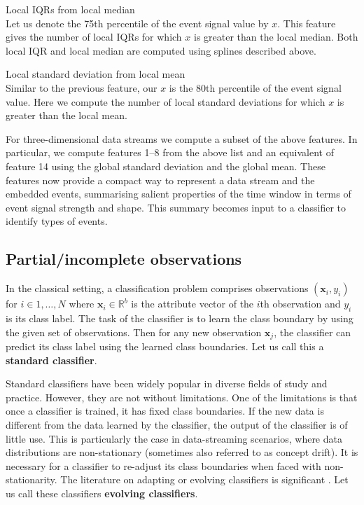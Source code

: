 \documentclass[a4paper,11pt]{article}
\begin{document}
\begin{compactenum}
	\item Local IQRs from local median \\
	      Let us denote the 75th percentile of the event signal value by $x$. This feature gives the number of local IQRs for which $x$ is greater than the local median. Both local IQR and local median are computed using splines described above.
	\item Local standard deviation from local mean \\
	      Similar to the previous feature, our $x$ is the 80th percentile of the event signal value. Here we compute the number of local standard deviations for which $x$ is greater than the local mean.
\end{compactenum}

For three-dimensional data streams we compute a subset of the above features. In particular, we compute features 1--8 from the above list and an equivalent of feature 14 using the global standard deviation and the global mean. These features now provide a compact way to represent a data stream and the embedded events, summarising salient properties of the time window in terms of event signal strength and shape. This summary becomes input to a classifier to identify types of events.

\subsection{Partial/incomplete observations} \label{sec:Notation}

In the classical setting, a classification problem comprises observations $(\bm{x}_i, y_i)$ for $i \in 1,\dots, N$ where $\bm{x}_i \in \mathbb{R}^b$ is the attribute vector of the $i$th observation and $y_i$ is its class label. The task of the classifier is to learn the class boundary by using the given set of observations. Then for any new observation $\bm{x}_j$, the classifier can predict its class label using the learned class boundaries. Let us call this a \textbf{standard classifier}.

Standard classifiers have been widely popular in diverse fields of study and practice. However, they are not without limitations. One of the limitations is that once a classifier is trained, it has fixed class boundaries. If the new data is different from the data learned by the classifier, the output of the classifier is of little use. This is particularly the case in data-streaming scenarios, where data distributions are non-stationary (sometimes also referred to as concept drift). It is necessary for a classifier to re-adjust its class boundaries when faced with non-stationarity. The literature on adapting or evolving classifiers is significant \citep{duchi2011adaptive, dabbagh2005online, frey1991letter, giacinto1997adaptive, nishida2005ace,alippi2008just, alippi2008just2}. Let us call these classifiers \textbf{evolving classifiers}.
\end{document}
